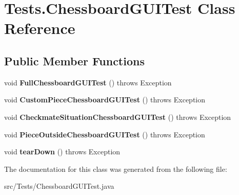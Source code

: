 \hypertarget{class_tests_1_1_chessboard_g_u_i_test}{}\section{Tests.\+Chessboard\+G\+U\+I\+Test Class Reference}
\label{class_tests_1_1_chessboard_g_u_i_test}
\subsection*{Public Member Functions}
\begin{DoxyCompactItemize}
\item 
\mbox{\label{class_tests_1_1_chessboard_g_u_i_test_a5a9da2f8c2f014f31aa34d4bb781b4ae}} 
void {\bfseries Full\+Chessboard\+G\+U\+I\+Test} ()  throws Exception 
\item 
\mbox{\label{class_tests_1_1_chessboard_g_u_i_test_a84f66182a48f7474ef33eacaf165567d}} 
void {\bfseries Custom\+Piece\+Chessboard\+G\+U\+I\+Test} ()  throws Exception 
\item 
\mbox{\label{class_tests_1_1_chessboard_g_u_i_test_ad1c574e527444b3299e7b3f3323024fe}} 
void {\bfseries Checkmate\+Situation\+Chessboard\+G\+U\+I\+Test} ()  throws Exception 
\item 
\mbox{\label{class_tests_1_1_chessboard_g_u_i_test_ab139828ce3540931f2cd2bec144df59a}} 
void {\bfseries Piece\+Outside\+Chessboard\+G\+U\+I\+Test} ()  throws Exception 
\item 
\mbox{\label{class_tests_1_1_chessboard_g_u_i_test_a432558b43ad2d177d971f1da866f4462}} 
void {\bfseries tear\+Down} ()  throws Exception 
\end{DoxyCompactItemize}


The documentation for this class was generated from the following file\+:\begin{DoxyCompactItemize}
\item 
src/\+Tests/Chessboard\+G\+U\+I\+Test.\+java\end{DoxyCompactItemize}
